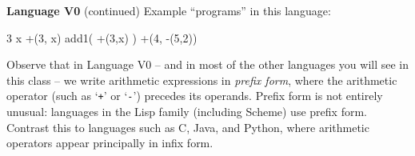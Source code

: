 \begin{minipage}[t]{\sw}
\slidenumber
\LARGE
{\bf Language V0} (continued)\exx
Example ``programs'' in this language:
\begin{qv}
3
x
+(3, x)
add1( +(3,x) )
+(4, -(5,2))
\end{qv}
Observe that in Language V0 --
and in most of the other languages you will see in this class --
we write arithmetic expressions in {\em prefix form},
where the arithmetic operator (such as `\verb'+'' or `\verb'-'')
precedes its operands.
Prefix form is not entirely unusual:
languages in the Lisp family (including Scheme) use prefix form.
Contrast this to languages such as C, Java, and Python,
where arithmetic operators appear principally in infix form.
\end{minipage}
\clearpage
